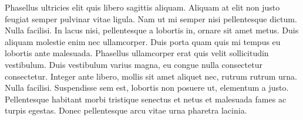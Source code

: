 Phasellus ultricies elit quis libero sagittis aliquam. Aliquam at elit non justo feugiat semper pulvinar vitae ligula. Nam ut mi semper nisi pellentesque dictum. Nulla facilisi. In lacus nisi, pellentesque a lobortis in, ornare sit amet metus. Duis aliquam molestie enim nec ullamcorper. Duis porta quam quis mi tempus eu lobortis ante malesuada. Phasellus ullamcorper erat quis velit sollicitudin vestibulum. Duis vestibulum varius magna, eu congue nulla consectetur consectetur. Integer ante libero, mollis sit amet aliquet nec, rutrum rutrum urna. Nulla facilisi. Suspendisse sem est, lobortis non posuere ut, elementum a justo. Pellentesque habitant morbi tristique senectus et netus et malesuada fames ac turpis egestas. Donec pellentesque arcu vitae urna pharetra lacinia.





